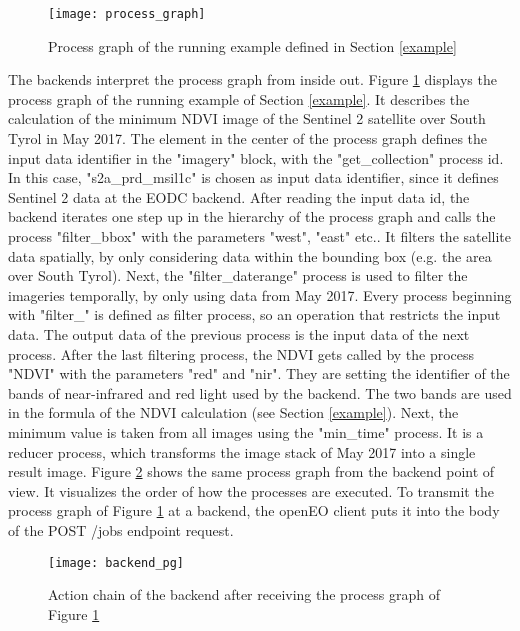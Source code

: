 \documentclass[draft,final]{vutinfth} %
\begin{document}
\begin{figure}[h]
	\centering
	\texttt{[image: process\_graph]}
	\caption{Process graph of the running example defined in Section \ref{example}}
	\label{fig:process_graph} %
\end{figure}


The backends interpret the process graph from inside out. Figure \ref{fig:process_graph} displays the process graph of the running example of Section \ref{example}. It describes the calculation of the minimum NDVI image of the Sentinel 2 satellite over South Tyrol in May 2017. The element in the center of the process graph defines the input data identifier in the "imagery" block, with the "get\_collection" process id. In this case, "s2a\_prd\_msil1c" is chosen as input data identifier, since it defines Sentinel 2 data at the EODC backend.
After reading the input data id, the backend iterates one step up in the hierarchy of the process graph and calls the process "filter\_bbox" with the parameters "west", "east" etc.. It filters the satellite data spatially, by only considering data within the bounding box (e.g. the area over South Tyrol). Next, the "filter\_daterange" process is used to filter the imageries temporally, by only using data from May 2017. Every process beginning with "filter\_" is defined as filter process, so an operation that restricts the input data. The output data of the previous process is the input data of the next process. After the last filtering process, the NDVI gets called by the process "NDVI" with the parameters "red" and "nir". They are setting the identifier of the bands of near-infrared and red light used by the backend. The two bands are used in the formula of the NDVI calculation (see Section \ref{example}). Next, the minimum value is taken from all images using the "min\_time" process. It is a reducer process, which transforms the image stack of May 2017 into a single result image. Figure \ref{fig:process_graph_diagram} shows the same process graph from the backend point of view. It visualizes the order of how the processes are executed. To transmit the process graph of Figure \ref{fig:process_graph} at a backend, the openEO client puts it into the body of the POST /jobs endpoint request.
\begin{figure}[h]
	\centering
	\texttt{[image: backend\_pg]}
	\caption{Action chain of the backend after receiving the process graph of Figure \ref{fig:process_graph}}
	\label{fig:process_graph_diagram} %
\end{figure}
\end{document}
